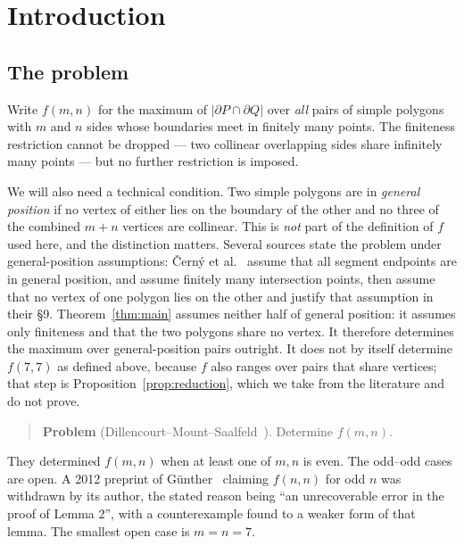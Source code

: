 \documentclass[11pt,a4paper]{article}
\theoremstyle{plain}
\theoremstyle{definition}
\theoremstyle{remark}
\begin{document}
\tableofcontents

\section{Introduction}

\subsection{The problem}

Write $f(m,n)$ for the maximum of
$\lvert \partial P \cap \partial Q\rvert$ over \emph{all} pairs of simple
polygons with $m$ and $n$ sides whose boundaries meet in finitely many points.
The finiteness restriction cannot be dropped --- two collinear overlapping sides
share infinitely many points --- but no further restriction is imposed.

We will also need a technical condition. Two simple polygons are in
\emph{general position} if no vertex of either lies on the boundary of the
other and no three of the combined $m+n$ vertices are collinear. This is
\emph{not} part of the definition of $f$ used here, and the distinction
matters. Several sources state the problem under general-position
assumptions: \v{C}ern\'y et al.~\cite[\S2]{CernyEtAl2003} assume that all
segment endpoints are in general position, and
\cite[\S3]{AckermanKeszeghRote2022} assume finitely many intersection points,
then assume that no vertex of one polygon lies on the other and justify that
assumption in their \S9. Theorem~\ref{thm:main} assumes neither half of
general position: it assumes only finiteness and that the two polygons share
no vertex. It therefore determines the maximum over general-position pairs
outright. It does not by itself determine $f(7,7)$ as defined above, because
$f$ also ranges over pairs that share vertices; that step is
Proposition~\ref{prop:reduction}, which we take from the literature and do not
prove.

\begin{quote}
\textbf{Problem} (Dillencourt--Mount--Saalfeld~\cite{DillencourtMountSaalfeld1993}).
Determine $f(m,n)$.
\end{quote}

They determined $f(m,n)$ when at least one of $m,n$ is even. The odd--odd cases
are open. A 2012 preprint of G\"unther~\cite{Gunther2012} claiming $f(n,n)$ for
odd $n$ was withdrawn by its author, the stated reason being ``an unrecoverable
error in the proof of Lemma 2'', with a counterexample found to a weaker form of
that lemma. The smallest open case is $m=n=7$.
\end{document}
